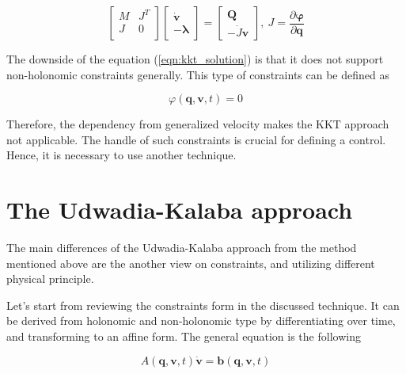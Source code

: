 \begin{equation}
    \begin{bmatrix}
        M & J^T \\
        J & 0 \\
    \end{bmatrix}
    \begin{bmatrix}
        \dot{\mathbf{v}} \\
        -\pmb{\lambda}
    \end{bmatrix} = 
    \begin{bmatrix}
        \mathbf{Q} \\
        -\dot{J} \mathbf{v}
    \end{bmatrix}, \:
    J = \frac{\partial \boldsymbol{\varphi}}{\partial \mathbf{q}}
    \label{eqn:kkt_solution}
\end{equation}

The downside of the equation (\ref{eqn:kkt_solution}) is that it does not support 
non-holonomic constraints generally. This type of constraints can be defined as 

\begin{equation}
    \varphi(\mathbf{q}, \mathbf{v}, t) = 0
    \label{eqn:non_holonomic_const}
\end{equation}

Therefore, the dependency from generalized velocity makes the KKT approach not 
applicable. The handle of such constraints is crucial for defining a control. 
Hence, it is necessary to use another technique.

\section{The Udwadia-Kalaba approach} \label{sec:udwadia_kalaba_app}

The main differences of the Udwadia-Kalaba approach from the method mentioned 
above are the another view on constraints, and utilizing different physical 
principle.

Let's start from reviewing the constraints form in the discussed technique. It 
can be derived from holonomic and non-holonomic type by differentiating over time, 
and transforming to an affine form. The general equation is the following 

\begin{equation}
    A(\mathbf{q}, \mathbf{v}, t) \dot{\mathbf{v}} = 
    \mathbf{b}(\mathbf{q}, \mathbf{v}, t)
    \label{eqn:affine_const}
\end{equation}

